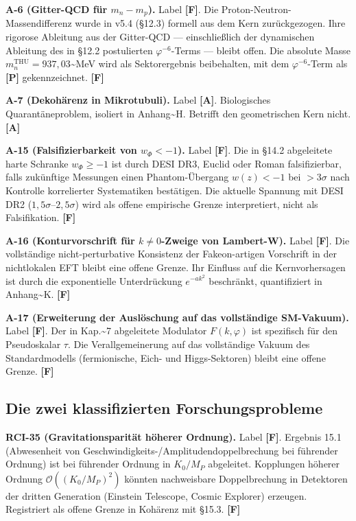 ﻿\documentclass[11pt,letterpaper]{article}
\begin{document}
\textbf{A-6 (Gitter-QCD für $m_n - m_p$).} Label \textbf{[F]}. Die Proton-Neutron-Massendifferenz wurde in v5.4 (§12.3) formell aus dem Kern zurückgezogen. Ihre rigorose Ableitung aus der Gitter-QCD --- einschließlich der dynamischen Ableitung des in §12.2 postulierten $\varphi^{-6}$-Terms --- bleibt offen. Die absolute Masse $m_n^{\text{THU}} = 937{,}03$\textasciitilde{}MeV wird als Sektorergebnis beibehalten, mit dem $\varphi^{-6}$-Term als \textbf{[P]} gekennzeichnet. \textbf{[F]}

\textbf{A-7 (Dekohärenz in Mikrotubuli).} Label \textbf{[A]}. Biologisches Quarantäneproblem, isoliert in Anhang\textasciitilde{}H. Betrifft den geometrischen Kern nicht. \textbf{[A]}

\textbf{A-15 (Falsifizierbarkeit von $w_\Phi < -1$).} Label \textbf{[F]}. Die in §14.2 abgeleitete harte Schranke $w_\Phi \geq -1$ ist durch DESI DR3, Euclid oder Roman falsifizierbar, falls zukünftige Messungen einen Phantom-Übergang $w(z) < -1$ bei $> 3\sigma$ nach Kontrolle korrelierter Systematiken bestätigen. Die aktuelle Spannung mit DESI DR2 ($1{,}5\sigma$--$2{,}5\sigma$) wird als offene empirische Grenze interpretiert, nicht als Falsifikation. \textbf{[F]}

\textbf{A-16 (Konturvorschrift für $k \neq 0$-Zweige von Lambert-W).} Label \textbf{[F]}. Die vollständige nicht-perturbative Konsistenz der Fakeon-artigen Vorschrift in der nichtlokalen EFT bleibt eine offene Grenze. Ihr Einfluss auf die Kernvorhersagen ist durch die exponentielle Unterdrückung $e^{-ak^2}$ beschränkt, quantifiziert in Anhang\textasciitilde{}K. \textbf{[F]}

\textbf{A-17 (Erweiterung der Auslöschung auf das vollständige SM-Vakuum).} Label \textbf{[F]}. Der in Kap.\textasciitilde{}7 abgeleitete Modulator $F(k, \varphi)$ ist spezifisch für den Pseudoskalar $\tau$. Die Verallgemeinerung auf das vollständige Vakuum des Standardmodells (fermionische, Eich- und Higgs-Sektoren) bleibt eine offene Grenze. \textbf{[F]}
\subsection{Die zwei klassifizierten Forschungsprobleme}
\textbf{RCI-35 (Gravitationsparität höherer Ordnung).} Label \textbf{[F]}. Ergebnis 15.1 (Abwesenheit von Geschwindigkeits-/Amplitudendoppelbrechung bei führender Ordnung) ist bei führender Ordnung in $K_0/M_P$ abgeleitet. Kopplungen höherer Ordnung $\mathcal{O}((K_0/M_P)^2)$ könnten nachweisbare Doppelbrechung in Detektoren der dritten Generation (Einstein Telescope, Cosmic Explorer) erzeugen. Registriert als offene Grenze in Kohärenz mit §15.3. \textbf{[F]}
\end{document}

